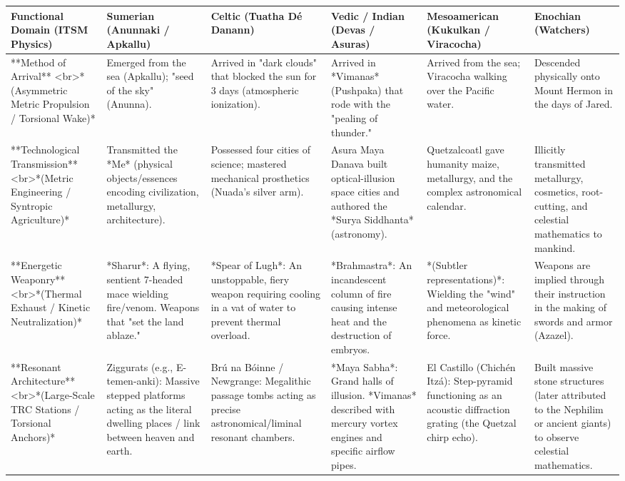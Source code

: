 \documentclass[aps,prd,11pt,onecolumn,superscriptaddress,nofootinbib,floatfix]{revtex4-2}
\begin{document}
\begin{table}[h!]
\centering
\begin{tabular}{p{3cm}p{3cm}p{3cm}p{3cm}p{3cm}p{3cm}}
\hline
Functional Domain (ITSM Physics) & Sumerian (Anunnaki / Apkallu) & Celtic (Tuatha Dé Danann) & Vedic / Indian (Devas / Asuras) & Mesoamerican (Kukulkan / Viracocha) & Enochian (Watchers) \\
\hline
**Method of Arrival** <br>*(Asymmetric Metric Propulsion / Torsional Wake)* & Emerged from the sea (Apkallu); "seed of the sky" (Anunna). & Arrived in "dark clouds" that blocked the sun for 3 days (atmospheric ionization). & Arrived in *Vimanas* (Pushpaka) that rode with the "pealing of thunder." & Arrived from the sea; Viracocha walking over the Pacific water. & Descended physically onto Mount Hermon in the days of Jared. \\
**Technological Transmission** <br>*(Metric Engineering / Syntropic Agriculture)* & Transmitted the *Me* (physical objects/essences encoding civilization, metallurgy, architecture). & Possessed four cities of science; mastered mechanical prosthetics (Nuada's silver arm). & Asura Maya Danava built optical-illusion space cities and authored the *Surya Siddhanta* (astronomy). & Quetzalcoatl gave humanity maize, metallurgy, and the complex astronomical calendar. & Illicitly transmitted metallurgy, cosmetics, root-cutting, and celestial mathematics to mankind. \\
**Energetic Weaponry** <br>*(Thermal Exhaust / Kinetic Neutralization)* & *Sharur*: A flying, sentient 7-headed mace wielding fire/venom. Weapons that "set the land ablaze." & *Spear of Lugh*: An unstoppable, fiery weapon requiring cooling in a vat of water to prevent thermal overload. & *Brahmastra*: An incandescent column of fire causing intense heat and the destruction of embryos. & *(Subtler representations)*: Wielding the "wind" and meteorological phenomena as kinetic force. & Weapons are implied through their instruction in the making of swords and armor (Azazel). \\
**Resonant Architecture** <br>*(Large-Scale TRC Stations / Torsional Anchors)* & Ziggurats (e.g., E-temen-anki): Massive stepped platforms acting as the literal dwelling places / link between heaven and earth. & Brú na Bóinne / Newgrange: Megalithic passage tombs acting as precise astronomical/liminal resonant chambers. & *Maya Sabha*: Grand halls of illusion. *Vimanas* described with mercury vortex engines and specific airflow pipes. & El Castillo (Chichén Itzá): Step-pyramid functioning as an acoustic diffraction grating (the Quetzal chirp echo). & Built massive stone structures (later attributed to the Nephilim or ancient giants) to observe celestial mathematics. \\

\end{tabular}
\end{table}
\end{document}
